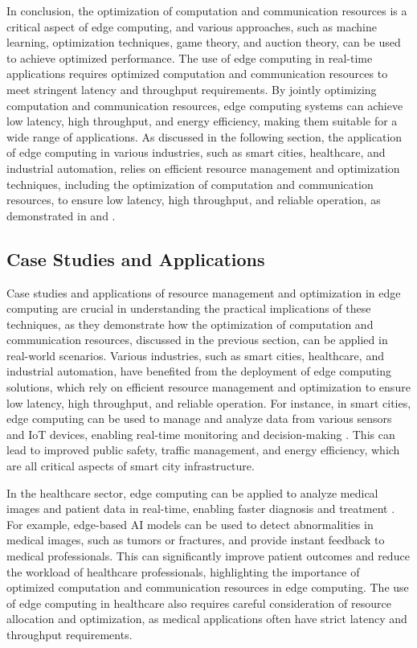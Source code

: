 \documentclass[11pt]{article}
\begin{document}
In conclusion, the optimization of computation and communication resources is a critical aspect of edge computing, and various approaches, such as machine learning, optimization techniques, game theory, and auction theory, can be used to achieve optimized performance. The use of edge computing in real-time applications requires optimized computation and communication resources to meet stringent latency and throughput requirements. By jointly optimizing computation and communication resources, edge computing systems can achieve low latency, high throughput, and energy efficiency, making them suitable for a wide range of applications. As discussed in the following section, the application of edge computing in various industries, such as smart cities, healthcare, and industrial automation, relies on efficient resource management and optimization techniques, including the optimization of computation and communication resources, to ensure low latency, high throughput, and reliable operation, as demonstrated in \cite{ref156} and \cite{ref157}.

\subsection{Case Studies and Applications}

Case studies and applications of resource management and optimization in edge computing are crucial in understanding the practical implications of these techniques, as they demonstrate how the optimization of computation and communication resources, discussed in the previous section, can be applied in real-world scenarios. Various industries, such as smart cities, healthcare, and industrial automation, have benefited from the deployment of edge computing solutions, which rely on efficient resource management and optimization to ensure low latency, high throughput, and reliable operation. For instance, in smart cities, edge computing can be used to manage and analyze data from various sensors and IoT devices, enabling real-time monitoring and decision-making \cite{ref3}. This can lead to improved public safety, traffic management, and energy efficiency, which are all critical aspects of smart city infrastructure.

In the healthcare sector, edge computing can be applied to analyze medical images and patient data in real-time, enabling faster diagnosis and treatment \cite{ref158}. For example, edge-based AI models can be used to detect abnormalities in medical images, such as tumors or fractures, and provide instant feedback to medical professionals. This can significantly improve patient outcomes and reduce the workload of healthcare professionals, highlighting the importance of optimized computation and communication resources in edge computing. The use of edge computing in healthcare also requires careful consideration of resource allocation and optimization, as medical applications often have strict latency and throughput requirements.
\end{document}
